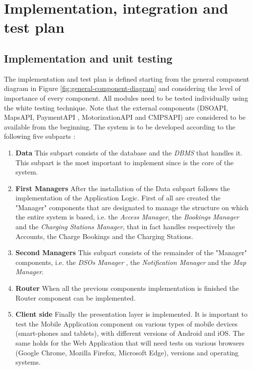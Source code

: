 \documentclass[a4paper]{report}
\begin{document}
\chapter{Implementation, integration and test plan}
\section{Implementation and unit testing}
The implementation and test plan is defined starting from the general component diagram in Figure \ref{fig:general-component-diagram} and considering the level of importance of every component. All modules need to be tested individually using the white testing technique. Note that the external components (DSOAPI, MapsAPI, PaymentAPI , MotorizationAPI and CMPSAPI) are considered
to be available from the beginning. The system is to be developed according to the following five subparts :
\begin{enumerate}
    \item \textbf{Data}\newline
    This subpart consists of the database and the \textit{DBMS} that handles it. This subpart is the most important to implement since is the core of the system.
    \item \textbf{First Managers}\newline
    After the installation of the Data subpart follows the implementation of the Application Logic. First of all are created the "Manager" components that are designated to manage the structure on which the entire system is based, i.e. the \textit{Access Manager}, the \textit{Bookings Manager} and the \textit{Charging Stations Manager}, that in fact handles respectively
    the Accounts, the Charge Bookings and the Charging Stations.
    \item \textbf{Second Managers}\newline
    This subpart consists of the remainder of the "Manager" components, i.e. the \textit{DSOs Manager} , the \textit{Notification Manager} and the \textit{Map Manager}.
    \item \textbf{Router}\newline
    When all the previous components implementation is finished the Router component can be implemented.
    \item \textbf{Client side}\newline
    Finally the presentation layer is implemented. It is important to test the Mobile Application component on various types of mobile devices (smart-phones and tablets), with different versions of Android and iOS. The same holds for the Web Application that will need tests on various browsers (Google Chrome, Mozilla Firefox, Microsoft Edge), versions and operating systems.
\end{enumerate}
\end{document}
